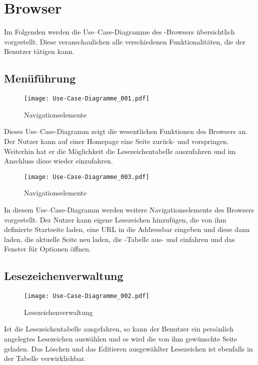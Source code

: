
\chapter{Browser}
Im Folgenden werden die Use--Case-Diagramme des \SECH-Browsers übersichtlich vorgestellt. Diese veranschaulichen alle verschiedenen Funktionalitäten, die der Benutzer tätigen kann.

\section{Menüführung}
\begin{figure}[htb]
\texttt{[image: Use-Case-Diagramme\_001.pdf]}
	\caption{Navigationselemente}
	\label{fig:Navigationselemente}
\end{figure}
Dieses Use--Case-Diagramm zeigt die wesentlichen Funktionen des Browsers an. Der Nutzer kann auf einer Homepage eine Seite zurück- und vorspringen. Weiterhin hat er die Möglichkeit die Lesezeichentabelle auszufahren und im Anschluss diese wieder einzufahren.

\begin{figure}[htb]
\texttt{[image: Use-Case-Diagramme\_003.pdf]}
	\caption{Navigationselemente}
	\label{fig:Navigationselemente}
\end{figure}
In diesem Use--Case-Diagramm werden weitere Navigationselemente des Browsers vorgestellt. Der Nutzer kann eigene Lesezeichen hinzufügen, die von ihm definierte Startseite laden, eine URL in die Addressbar eingeben und diese dann laden, die aktuelle Seite neu laden, die \SEARCH-Tabelle aus- und einfahren und das Fenster für Optionen öffnen.

\section{Lesezeichenverwaltung}
\begin{figure}[htb]
\texttt{[image: Use-Case-Diagramme\_002.pdf]}
	\caption{Lesezeichenverwaltung}
	\label{fig:Lesezeichenverwaltung}
\end{figure}
Ist die Lesezeichentabelle ausgefahren, so kann der Benutzer ein persönlich angelegtes Lesezeichen auswählen und es wird die von ihm gewünschte Seite geladen. Das Löschen und das Editieren ausgewählter Lesezeichen ist ebenfalls in der Tabelle verwirklichbar.

